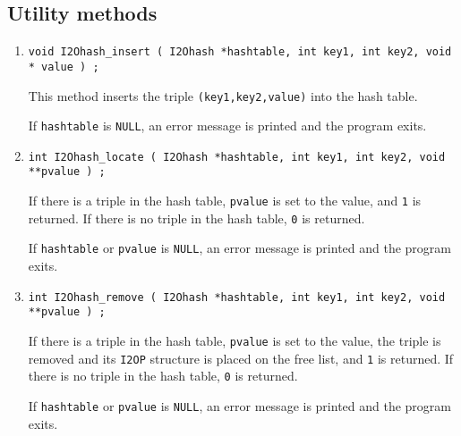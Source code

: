 \subsection{Utility methods}
\label{subsection:I2Ohash:proto:utilities}
\par
\begin{enumerate}
\item
\begin{verbatim}
void I2Ohash_insert ( I2Ohash *hashtable, int key1, int key2, void * value ) ;
\end{verbatim}
This method inserts the triple {\tt (key1,key2,value)} 
into the hash table.
\par {}
If {\tt hashtable} is {\tt NULL},
an error message is printed and the program exits.
\item
\begin{verbatim}
int I2Ohash_locate ( I2Ohash *hashtable, int key1, int key2, void **pvalue ) ;
\end{verbatim}
If there is a {\tt <key1,key2,value>} triple in the hash table,
{\tt *pvalue} is set to the value, 
and {\tt 1} is returned.
If there is no {\tt <key1,key2,value>} triple in the hash table,
{\tt 0} is returned.
\par {}
If {\tt hashtable} or {\tt pvalue} is {\tt NULL},
an error message is printed and the program exits.
\item
\begin{verbatim}
int I2Ohash_remove ( I2Ohash *hashtable, int key1, int key2, void **pvalue ) ;
\end{verbatim}
If there is a {\tt <key1,key2,value>} triple in the hash table,
{\tt *pvalue} is set to the value, the triple is removed and its
{\tt I2OP} structure is placed on the free list,
and {\tt 1} is returned.
If there is no {\tt <key1,key2,value>} triple in the hash table,
{\tt 0} is returned.
\par {}
If {\tt hashtable} or {\tt pvalue} is {\tt NULL},
an error message is printed and the program exits.

\end{enumerate}
